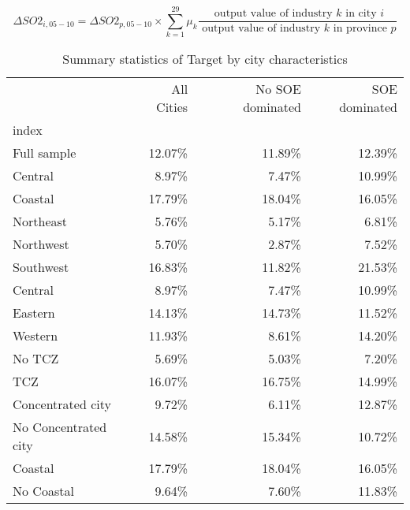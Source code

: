 \documentclass[12pt]{article}
\begin{document}
\begin{equation} \label{eq:equation_2}
\Delta SO2_{i, 05 − 10}=\Delta SO2_{p, 05 − 10} \times \sum_{k=1}^{29} \mu_{k} \frac{\text { output value of industry } k \text { in city } i}{\text { output value of industry } k \text { in province } p}
\end{equation}


\begin{table}[!htbp] \centering
\caption{Summary statistics of Target by city characteristics}
\label{table_4}
\begin{adjustbox}{width=\textwidth, totalheight=\baselineskip,keepaspectratio}
\begin{tabular}{lrrr}
\toprule
{} & All Cities & No SOE dominated & SOE dominated \\
index                &            &                  &               \\
\midrule
Full sample          &     12.07\% &           11.89\% &        12.39\% \\
Central              &      8.97\% &            7.47\% &        10.99\% \\
Coastal              &     17.79\% &           18.04\% &        16.05\% \\
Northeast            &      5.76\% &            5.17\% &         6.81\% \\
Northwest            &      5.70\% &            2.87\% &         7.52\% \\
Southwest            &     16.83\% &           11.82\% &        21.53\% \\
Central              &      8.97\% &            7.47\% &        10.99\% \\
Eastern              &     14.13\% &           14.73\% &        11.52\% \\
Western              &     11.93\% &            8.61\% &        14.20\% \\
No TCZ               &      5.69\% &            5.03\% &         7.20\% \\
TCZ                  &     16.07\% &           16.75\% &        14.99\% \\
Concentrated city    &      9.72\% &            6.11\% &        12.87\% \\
No Concentrated city &     14.58\% &           15.34\% &        10.72\% \\
Coastal              &     17.79\% &           18.04\% &        16.05\% \\
No Coastal           &      9.64\% &            7.60\% &        11.83\% \\
\bottomrule
\end{tabular}
\end{adjustbox}
\begin{tablenotes} 
 \small 
 \item \\ 


\end{tablenotes}
\end{table}
\end{document}
